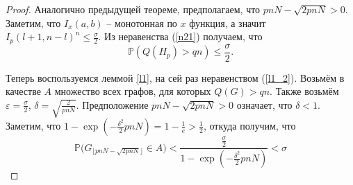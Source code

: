 \documentclass[10pt]{article}
\newcommand{\PRob}{\mathbb P}
\newcommand{\leqs}{\leqslant}
\newcommand{\eps}{\varepsilon}
\theoremstyle{named}
\begin{document}
\begin{proof}
Аналогично предыдущей теореме, предполагаем, что $pnN - \sqrt{2pnN} > 0$.
Заметим, что $I_x(a,b)$ -- монотонная по $x$ функция, а значит $I_p(l+1, n-l)^n \leqs \frac\sigma{2}$. 
Из неравенства (\ref{n21}) получаем, что
\begin{equation}
\PRob(Q(H_p) > qn) \leqs \frac\sigma{2}.
\end{equation}

Теперь воспользуемся леммой \ref{l1}, на сей раз неравенством (\ref{l1_2}).
Возьмём в качестве $A$ множество всех графов, для которых $Q(G) > qn$.
Также возьмём $\eps = \frac\sigma{2}$, $\delta = \sqrt{\frac{2}{pnN}}$.
Предположение $pnN - \sqrt{2pnN} > 0$ означает, что $\delta < 1$.
Заметим, что $1 - \exp\left(-\frac{\delta^2}{2}pnN\right) = 1 - \frac{1}{e} > \frac{1}{2}$, откуда получим, что
\begin{equation}
\PRob\big(G_{\lfloor pnN - \sqrt{2pnN} \rfloor} \in A\big) 
	< 
\frac{\frac\sigma{2}}{1 - \exp\left(-\frac{\delta^2}{2}pnN\right)}
	<
\sigma
\end{equation}
\end{proof}
\end{document}
